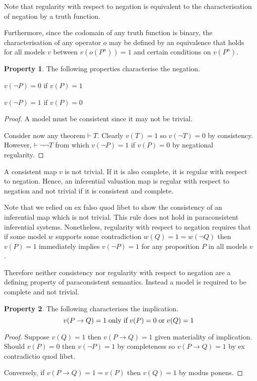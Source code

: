 \documentclass{amsbook}
\newcommand{\theorem}{\mathord\vdash\medspace}
\newcommand{\then}{\mathrel\rightarrow}
\theoremstyle{definition}
\newtheorem{prop}{Property}[section]
\begin{document}
Note that regularity with respect to negation is equivalent to the characterisation of negation by a truth function.

Furthermore, since the codomain of any truth function is binary, the characterisation of any operator $o$ may be defined by an equivalence that holds for all models $v$ between $v(o(P^n)) = 1$ and certain conditions on $v(P^n)$.

\begin{prop}
    The following properties characterise the negation.
    \begin{description}[
            labelindent=\parindent,
            before={
                    \renewcommand\makelabel[1]{(##1).}
                }
        ]
        \item[consistency] $v(\neg P) = 0$ if $v(P) = 1$
        \item[completeness] $v(\neg P) = 1$ if $v(P) = 0$
    \end{description}

    \begin{proof}
        A model must be consistent since it may not be trivial.

        Consider now any theorem $\theorem T$. Clearly $v(T) = 1$ so $v(\neg T) = 0$ by consistency. However, $\theorem \neg\neg T$ from which $v(\neg P) = 1$ if $v(P) = 0$ by negational regularity.
    \end{proof}
\end{prop}

A consistent map $v$ is not trivial. If it is also complete, it is regular with respect to negation. Hence, an inferential valuation map is regular with respect to negation and not trivial if it is consistent and complete.

Note that we relied on ex falso quod libet to show the consistency of an inferential map which is not trivial. This rule does not hold in paraconsistent inferential systems. Nonetheless, regularity with respect to negation requires that if some model $w$ supports some contradiction $w(Q) = 1 = w(\neg Q)$ then $v(P) = 1$ immediately implies $v(\neg P) = 1$ for any proposition $P$ in all models $v$.

Therefore neither consistency nor regularity with respect to negation are a defining property of paraconsistent semantics. Instead a model is required to be complete and not trivial.

\begin{prop}
    The following characterises the implication.
    $$v(P \then Q) = 1 \text{\;only if\;} v(P) = 0\text{\;or\;}v(Q) = 1$$
    \begin{proof}
        Suppose $v(Q) = 1$ then $v(P \then Q) = 1$ given materiality of implication. Should $v(P) = 0$ then $v(\neg P) = 1$ by completeness so $v(P \then Q) = 1$ by ex contradictio quod libet.

        Conversely, if $v(P \then Q) = 1 = v(P)$ then $v(Q) = 1$ by modus ponens.
    \end{proof}
\end{prop}
\end{document}
